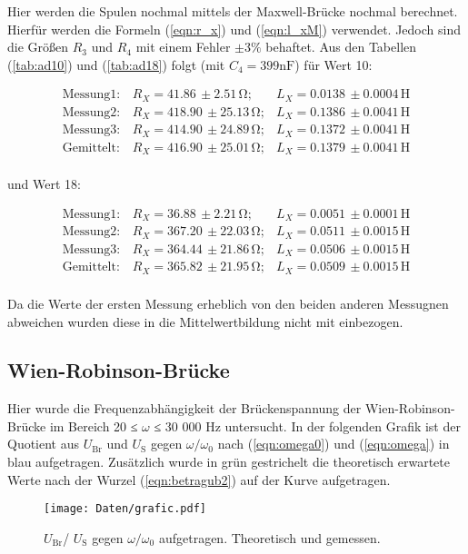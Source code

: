 Hier werden die Spulen nochmal mittels der Maxwell-Brücke nochmal berechnet. Hierfür werden die Formeln  (\ref{eqn:r_x}) und (\ref{eqn:l_xM}) verwendet.
Jedoch sind die Größen $R_3$ und $R_4$ mit einem Fehler $\pm 3\%$ behaftet. Aus den Tabellen (\ref{tab:ad10}) und (\ref{tab:ad18}) folgt (mit $C_4 = 399 \si{\nano\farad} $) für Wert 10:

\begin{align*}
\text{Messung}1:& R_X =  41.86  \, \pm 2.51   \, \si{\ohm};& L_X =  0.0138 \, \pm 0.0004  \, \si{\henry}\\
\text{Messung}2:& R_X = 418.90  \, \pm 25.13  \, \si{\ohm};& L_X =  0.1386 \, \pm 0.0041  \, \si{\henry}\\
\text{Messung}3:& R_X = 414.90  \, \pm 24.89  \, \si{\ohm};& L_X =  0.1372 \, \pm 0.0041  \, \si{\henry}\\
\text{Gemittelt}:& R_X= 416.90  \, \pm 25.01  \, \si{\ohm};& L_X =  0.1379 \, \pm 0.0041  \, \si{\henry}\\ 
\end{align*}

und Wert 18:

\begin{align*}
\text{Messung}1:& R_X = 36.88   \, \pm  2.21   \, \si{\ohm};& L_X =  0.0051 \, \pm 0.0001  \, \si{\henry}\\
\text{Messung}2:& R_X = 367.20  \, \pm  22.03  \, \si{\ohm};& L_X =  0.0511 \, \pm 0.0015  \, \si{\henry}\\
\text{Messung}3:& R_X = 364.44  \, \pm  21.86  \, \si{\ohm};& L_X =  0.0506 \, \pm 0.0015  \, \si{\henry}\\
\text{Gemittelt}:& R_X= 365.82  \, \pm  21.95  \, \si{\ohm};& L_X =  0.0509 \, \pm 0.0015  \, \si{\henry}\\
\end{align*}

Da die Werte der ersten Messung erheblich von den beiden anderen Messugnen abweichen wurden diese in die Mittelwertbildung nicht mit einbezogen.

\newpage
\subsection{Wien-Robinson-Brücke}

Hier wurde die Frequenzabhängigkeit der Brückenspannung der Wien-Robinson-Brücke im Bereich 20 ≤ $\omega$ ≤ 30 000 Hz untersucht. 
In der folgenden Grafik ist der Quotient aus $U_\text{Br}$ und $U_\text{S}$ gegen $\omega/\omega_0$ nach (\ref{eqn:omega0}) und (\ref{eqn:omega}) in blau aufgetragen.
Zusätzlich wurde in grün gestrichelt die theoretisch erwartete Werte nach der Wurzel (\ref{eqn:betragub2}) auf der Kurve aufgetragen.
\begin{figure}
    \centering
    \texttt{[image: Daten/grafic.pdf]}
    \caption{$U_\text{Br}$/ $U_\text{S}$ gegen $\omega/\omega_0$ aufgetragen. Theoretisch und gemessen.}
\end{figure}

